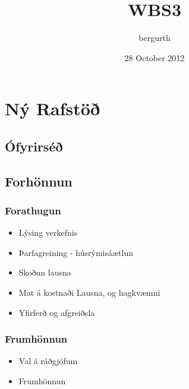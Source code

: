 \documentclass[11pt]{article}
\title{WBS3}
\author{bergurth}
\date{28 October 2012}
\begin{document}
\maketitle

\setcounter{tocdepth}{3}
\tableofcontents
\vspace*{1cm}
\section{Ný Rafstöð}
\label{sec-1}


\subsection{Ófyrirséð}
\label{sec-1.1}

\subsection{Forhönnun}
\label{sec-1.2}

\subsubsection{Forathugun}
\label{sec-1.2.1}

\begin{itemize}

\item Lýsing verkefnis\\
\label{sec-1.2.1.1}


\item Þarfagreining - húsrýmisáætlun\\
\label{sec-1.2.1.2}


\item Skoðun lausna\\
\label{sec-1.2.1.3}


\item Mat á kostnaði Lausna, og hagkvæmni\\
\label{sec-1.2.1.4}


\item Yfirferð og afgreiðsla\\
\label{sec-1.2.1.5}

\end{itemize} %
\subsubsection{Frumhönnun}
\label{sec-1.2.2}

\begin{itemize}

\item Val á ráðgjöfum\\
\label{sec-1.2.2.1}


\item Frumhönnun\\
\label{sec-1.2.2.2}

\end{itemize} %
\end{document}
